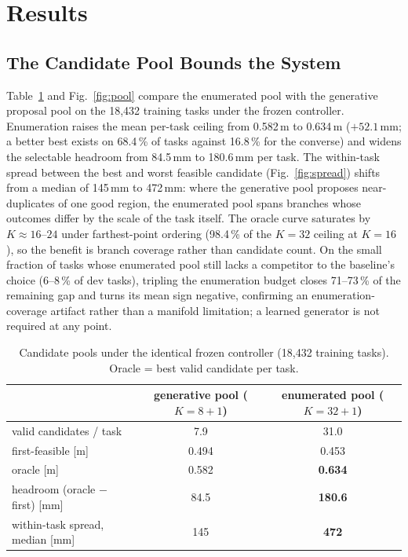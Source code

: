 \documentclass{svproc}
\begin{document}
\section{Results}
\label{sec:results}

\subsection{The Candidate Pool Bounds the System}
\label{sec:pool}
Table~\ref{tab:pool} and Fig.~\ref{fig:pool} compare the enumerated pool with
the generative proposal pool on the 18{,}432 training tasks under the frozen
controller. Enumeration raises the mean per-task ceiling from 0.582\,m to
0.634\,m ($+52.1$\,mm; a better best exists on 68.4\,\% of tasks against
16.8\,\% for the converse) and widens the selectable headroom from 84.5\,mm to
180.6\,mm per task. The within-task spread between the best and worst feasible
candidate (Fig.~\ref{fig:spread}) shifts from a median of 145\,mm to 472\,mm:
where the generative pool proposes near-duplicates of one good region, the
enumerated pool spans branches whose outcomes differ by the scale of the task
itself. The oracle curve saturates by $K{\approx}16$--$24$ under
farthest-point ordering (98.4\,\% of the $K{=}32$ ceiling at $K{=}16$), so the
benefit is branch coverage rather than candidate count. On the small fraction
of tasks whose enumerated pool still lacks a competitor to the baseline's
choice (6--8\,\% of dev tasks), tripling the enumeration budget closes
71--73\,\% of the remaining gap and turns its mean sign negative, confirming
an enumeration-coverage artifact rather than a manifold limitation; a learned
generator is not required at any point.

\begin{table}[!tbp]
\centering
\caption{Candidate pools under the identical frozen controller
(18{,}432 training tasks). Oracle = best valid candidate per task.}
\label{tab:pool}
\begin{tabular}{lcc}
\toprule
 & generative pool ($K{=}8{+}1$) & enumerated pool ($K{=}32{+}1$) \\
\midrule
valid candidates / task & 7.9 & 31.0 \\
first-feasible [m] & 0.494 & 0.453 \\
oracle [m] & 0.582 & \textbf{0.634} \\
headroom (oracle $-$ first) [mm] & 84.5 & \textbf{180.6} \\
within-task spread, median [mm] & 145 & \textbf{472} \\
\bottomrule
\end{tabular}
\end{table}
\end{document}
